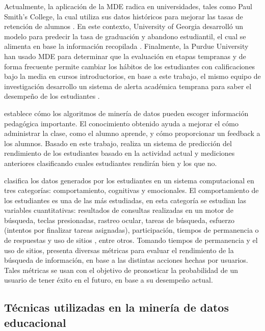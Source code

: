 Actualmente, la aplicación de la MDE radica en universidades, tales como Paul Smith’s College, la cual utiliza sus datos históricos para mejorar las tasas de retención de alumnos \parencite{bichsel2012analytics}. En este contexto, University of Georgia desarrolló un modelo para predecir la tasa de graduación y abandono estudiantil, el cual se alimenta en base la información recopilada \parencite{morris2005predicting}. Finalmente, la Purdue University han usado MDE para determinar que la evaluación en etapas tempranas y de forma frecuente permite cambiar los hábitos de los estudiantes con calificaciones bajo la media en cursos introductorios, en base a este trabajo, el mismo equipo de investigación desarrollo un sistema de alerta académica temprana para saber el desempeño de los estudiantes \parencite{baepler2010academic}. 

\textcite{merceron2005educational} establece cómo los algoritmos de minería de datos pueden escoger información pedagógica importante. El conocimiento obtenido ayuda a mejorar el cómo administrar la clase, como el alumno aprende, y cómo proporcionar un feedback a los alumnos. Basado en este trabajo, \textcite{abdullah2014students} realiza un sistema de predicción del rendimiento de los estudiantes basado en la actividad actual y mediciones anteriores clasificando cuales estudiantes rendirán bien y los que no. 

\textcite{henrie2015measuring} clasifica los datos generados por los estudiantes en un sistema computacional en tres categorías: comportamiento, cognitivas y emocionales. El comportamiento de los estudiantes es una de las más estudiadas, en esta categoría se estudian las variables cuantitativas: resultados de consultas realizadas en un motor de búsqueda, teclas presionadas, rastreo ocular, tareas de búsqueda, esfuerzo (intentos por finalizar tareas asignadas), participación, tiempos de permanencia o de respuestas y uso de sitios , entre otros. Tomando tiempos de permanencia y el uso de sitios, \textcite{Shah2016} presenta diversas métricas para evaluar el rendimiento de la búsqueda de información, en base a las distintas acciones hechas por usuarios. Tales métricas se usan con el objetivo de pronosticar la probabilidad de un usuario de tener éxito en el futuro, en base a su desempeño actual. 


\subsection*{Técnicas utilizadas en la minería de datos educacional}


